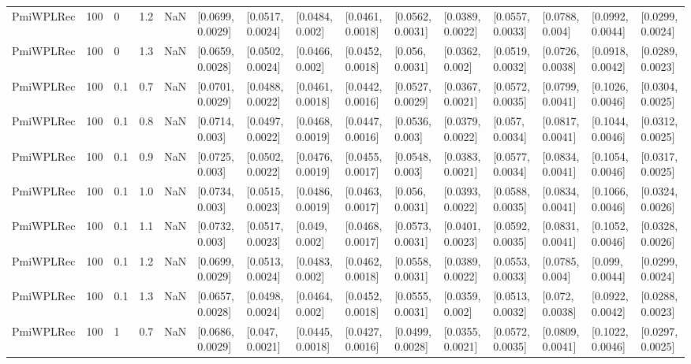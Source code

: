 \begin{tabular}{lllrrllllllllll}
 PmiWPLRec &  100 &     0 &   1.2 &   NaN &  [0.0699, 0.0029] &  [0.0517, 0.0024] &   [0.0484, 0.002] &  [0.0461, 0.0018] &  [0.0562, 0.0031] &  [0.0389, 0.0022] &  [0.0557, 0.0033] &   [0.0788, 0.004] &  [0.0992, 0.0044] &  [0.0299, 0.0024] \\
 PmiWPLRec &  100 &     0 &   1.3 &   NaN &  [0.0659, 0.0028] &  [0.0502, 0.0024] &   [0.0466, 0.002] &  [0.0452, 0.0018] &   [0.056, 0.0031] &   [0.0362, 0.002] &  [0.0519, 0.0032] &  [0.0726, 0.0038] &  [0.0918, 0.0042] &  [0.0289, 0.0023] \\
 PmiWPLRec &  100 &   0.1 &   0.7 &   NaN &  [0.0701, 0.0029] &  [0.0488, 0.0022] &  [0.0461, 0.0018] &  [0.0442, 0.0016] &  [0.0527, 0.0029] &  [0.0367, 0.0021] &  [0.0572, 0.0035] &  [0.0799, 0.0041] &  [0.1026, 0.0046] &  [0.0304, 0.0025] \\
 PmiWPLRec &  100 &   0.1 &   0.8 &   NaN &   [0.0714, 0.003] &  [0.0497, 0.0022] &  [0.0468, 0.0019] &  [0.0447, 0.0016] &   [0.0536, 0.003] &  [0.0379, 0.0022] &   [0.057, 0.0034] &  [0.0817, 0.0041] &  [0.1044, 0.0046] &  [0.0312, 0.0025] \\
 PmiWPLRec &  100 &   0.1 &   0.9 &   NaN &   [0.0725, 0.003] &  [0.0502, 0.0022] &  [0.0476, 0.0019] &  [0.0455, 0.0017] &   [0.0548, 0.003] &  [0.0383, 0.0021] &  [0.0577, 0.0034] &  [0.0834, 0.0041] &  [0.1054, 0.0046] &  [0.0317, 0.0025] \\
 PmiWPLRec &  100 &   0.1 &   1.0 &   NaN &   [0.0734, 0.003] &  [0.0515, 0.0023] &  [0.0486, 0.0019] &  [0.0463, 0.0017] &   [0.056, 0.0031] &  [0.0393, 0.0022] &  [0.0588, 0.0035] &  [0.0834, 0.0041] &  [0.1066, 0.0046] &  [0.0324, 0.0026] \\
 PmiWPLRec &  100 &   0.1 &   1.1 &   NaN &   [0.0732, 0.003] &  [0.0517, 0.0023] &    [0.049, 0.002] &  [0.0468, 0.0017] &  [0.0573, 0.0031] &  [0.0401, 0.0023] &  [0.0592, 0.0035] &  [0.0831, 0.0041] &  [0.1052, 0.0046] &  [0.0328, 0.0026] \\
 PmiWPLRec &  100 &   0.1 &   1.2 &   NaN &  [0.0699, 0.0029] &  [0.0513, 0.0024] &   [0.0483, 0.002] &  [0.0462, 0.0018] &  [0.0558, 0.0031] &  [0.0389, 0.0022] &  [0.0553, 0.0033] &   [0.0785, 0.004] &   [0.099, 0.0044] &  [0.0299, 0.0024] \\
 PmiWPLRec &  100 &   0.1 &   1.3 &   NaN &  [0.0657, 0.0028] &  [0.0498, 0.0024] &   [0.0464, 0.002] &  [0.0452, 0.0018] &  [0.0555, 0.0031] &   [0.0359, 0.002] &  [0.0513, 0.0032] &   [0.072, 0.0038] &  [0.0922, 0.0042] &  [0.0288, 0.0023] \\
 PmiWPLRec &  100 &     1 &   0.7 &   NaN &  [0.0686, 0.0029] &   [0.047, 0.0021] &  [0.0445, 0.0018] &  [0.0427, 0.0016] &  [0.0499, 0.0028] &  [0.0355, 0.0021] &  [0.0572, 0.0035] &  [0.0809, 0.0041] &  [0.1022, 0.0046] &  [0.0297, 0.0025] \\

\end{tabular}
